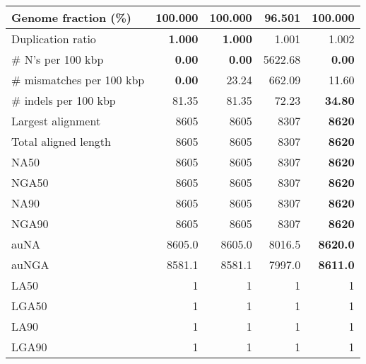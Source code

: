 \documentclass[12pt,a4paper]{article}
\begin{document}
\begin{table}[ht]
\begin{center}
\begin{tabular}{|l*{4}{|r}|}
Genome fraction (\%) & {\bf 100.000} & {\bf 100.000} & 96.501 & {\bf 100.000} \\ \hline
Duplication ratio & {\bf 1.000} & {\bf 1.000} & 1.001 & 1.002 \\ \hline
\# N's per 100 kbp & {\bf 0.00} & {\bf 0.00} & 5622.68 & {\bf 0.00} \\ \hline
\# mismatches per 100 kbp & {\bf 0.00} & 23.24 & 662.09 & 11.60 \\ \hline
\# indels per 100 kbp & 81.35 & 81.35 & 72.23 & {\bf 34.80} \\ \hline
Largest alignment & 8605 & 8605 & 8307 & {\bf 8620} \\ \hline
Total aligned length & 8605 & 8605 & 8307 & {\bf 8620} \\ \hline
NA50 & 8605 & 8605 & 8307 & {\bf 8620} \\ \hline
NGA50 & 8605 & 8605 & 8307 & {\bf 8620} \\ \hline
NA90 & 8605 & 8605 & 8307 & {\bf 8620} \\ \hline
NGA90 & 8605 & 8605 & 8307 & {\bf 8620} \\ \hline
auNA & 8605.0 & 8605.0 & 8016.5 & {\bf 8620.0} \\ \hline
auNGA & 8581.1 & 8581.1 & 7997.0 & {\bf 8611.0} \\ \hline
LA50 & 1 & 1 & 1 & 1 \\ \hline
LGA50 & 1 & 1 & 1 & 1 \\ \hline
LA90 & 1 & 1 & 1 & 1 \\ \hline
LGA90 & 1 & 1 & 1 & 1 \\ \hline
\end{tabular}
\end{center}
\end{table}
\end{document}
